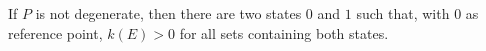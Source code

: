 If $P$ is not degenerate, then there are two states $0$ and $1$ such that, with $0$ as reference point, $k(E) > 0$ for all sets containing both states.
